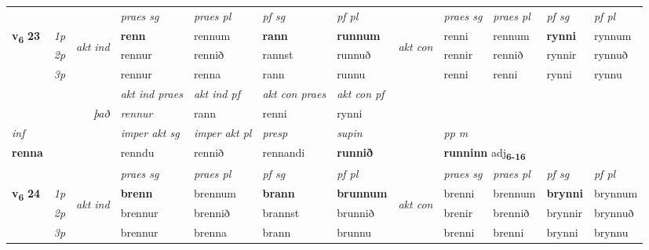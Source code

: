 \begin{longtable}[l]{X>{\footnotesize\itshape}llXXXXlXXXX}
\midrule

 & &   & \textit{praes sg}  & \textit{praes pl}    & \textit{ pf sg} & \textit{pf pl} & & \textit{praes sg}  & \textit{praes pl}    & \textit{pf sg} & \textit{pf pl }  \\ \cmidrule{4-7} \cmidrule{9-12}
 \multirow{2}{*}{{{\textbf{v{\textsubscript{6}}} \Large{\textbf{23}}}}}  & 1p & \multirow{3}{*}{\begin{turn}{90}\textit{akt ind}\end{turn}} & \textbf{renn} & rennum & \textbf{rann} & \textbf{runnum} & \multirow{3}{*}{\begin{turn}{90}\textit{akt con}\end{turn}} &renni & rennum & \textbf{rynni} & rynnum\\*
 & 2p &  &  rennur  & rennið & rannst & runnuð & & rennir & rennið & rynnir & rynnuð \\*
 & 3p &  & rennur & renna & rann & runnu & & renni & renni& rynni & rynnu \\*
\cmidrule{4-7} \cmidrule{9-12}

   && &  \textit{akt ind praes} & \textit{akt ind pf} & \textit{akt con praes} & \textit{akt con pf} \\*
\multicolumn{3}{r}{\textit{það}} & rennur & rann & renni & rynni \\*

\cmidrule{4-7}
   {\textit{inf}} & &  & \textit{imper akt sg} & \textit{imper akt pl}   & \textit{presp} & \textit{supin}  && \textit{pp m} \\*
  {\textbf{renna}} & && renndu  & rennið   & rennandi &  \textbf{runnið}  && \multicolumn{2}{l}{\textbf{runninn} adj\textbf{\textsubscript{6-16}}} \\*

\midrule

 & &   & \textit{praes sg}  & \textit{praes pl}    & \textit{ pf sg} & \textit{pf pl} & & \textit{praes sg}  & \textit{praes pl}    & \textit{pf sg} & \textit{pf pl }  \\ \cmidrule{4-7} \cmidrule{9-12}
 \multirow{2}{*}{{{\textbf{v{\textsubscript{6}}} \Large{\textbf{24}}}}}  & 1p & \multirow{3}{*}{\begin{turn}{90}\textit{akt ind}\end{turn}} & \textbf{brenn} & brennum & \textbf{brann} & \textbf{brunnum} & \multirow{3}{*}{\begin{turn}{90}\textit{akt con}\end{turn}} &brenni & brennum & \textbf{brynni} & brynnum\\*
 & 2p &  &  brennur  & brennið & brannst & brunnið & & brenir & brennið & brynnir & brynnuð \\*
 & 3p &  & brennur & brenna & brann & brunnu & & brenni & brenni& brynni & brynnu \\*
\cmidrule{4-7} \cmidrule{9-12}


\end{longtable}
